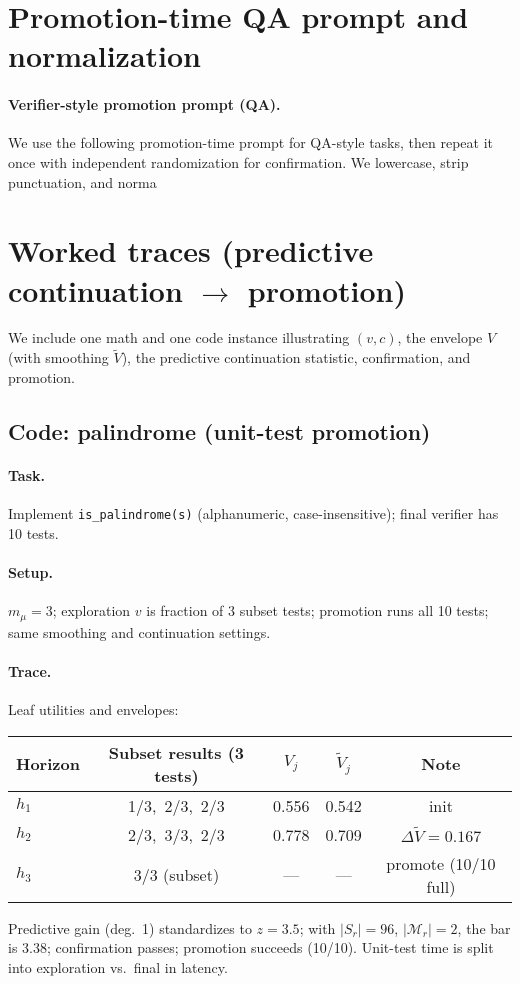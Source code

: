 \documentclass{article}
\begin{document}
\section{Promotion-time QA prompt and normalization}
\label{app:qa-prompt}
\paragraph{Verifier-style promotion prompt (QA).}
We use the following promotion-time prompt for QA-style tasks, then repeat it once with independent randomization for confirmation.
We lowercase, strip punctuation, and norma\section{Worked traces (predictive continuation $\to$ promotion)}
\label{app:worked-traces}
We include one math and one code instance illustrating $(v,c)$, the envelope $V$ (with smoothing $\tilde V$), the predictive continuation statistic, confirmation, and promotion.

\subsection{Code: palindrome (unit-test promotion)}
\paragraph{Task.} Implement \texttt{is\_palindrome(s)} (alphanumeric, case-insensitive); final verifier has 10 tests.
\paragraph{Setup.} $m_\mu{=}3$; exploration $v$ is fraction of 3 subset tests; promotion runs all 10 tests; same smoothing and continuation settings.
\paragraph{Trace.} Leaf utilities and envelopes:
\begin{center}
\begin{tabular}{lcccc}
\toprule
Horizon & Subset results (3 tests) & $V_j$ & $\tilde V_j$ & Note \\
\midrule
$h_1$ & 1/3,\ 2/3,\ 2/3 & 0.556 & 0.542 & init \\
$h_2$ & 2/3,\ 3/3,\ 2/3 & 0.778 & 0.709 & $\Delta\tilde V{=}0.167$ \\
$h_3$ & 3/3 (subset)    & ---   & ---   & promote (10/10 full) \\
\bottomrule
\end{tabular}
\end{center}
\noindent Predictive gain (deg.\ 1) standardizes to $z{=}3.5$; with $|S_r|{=}96$, $|\mathcal{M}_r|{=}2$, the bar is $3.38$; confirmation passes; promotion succeeds (10/10). Unit-test time is split into exploration vs.\ final in latency.
\end{document}
